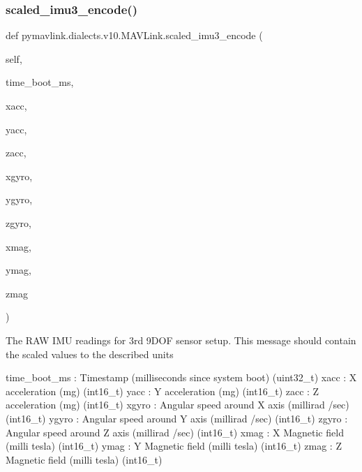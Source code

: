 \begin{DoxyVerb}
\begin{DoxyVerb}
\begin{DoxyVerb}
\begin{DoxyVerb}
\begin{DoxyVerb}
\begin{DoxyVerb}
\begin{DoxyVerb}
\begin{DoxyVerb}
\begin{DoxyVerb}
\begin{DoxyVerb}
\subsubsection{\texorpdfstring{scaled\+\_\+imu3\+\_\+encode()}{scaled\_imu3\_encode()}}
{\footnotesize\ttfamily def pymavlink.\+dialects.\+v10.\+M\+A\+V\+Link.\+scaled\+\_\+imu3\+\_\+encode (\begin{DoxyParamCaption}\item[{}]{self,  }\item[{}]{time\+\_\+boot\+\_\+ms,  }\item[{}]{xacc,  }\item[{}]{yacc,  }\item[{}]{zacc,  }\item[{}]{xgyro,  }\item[{}]{ygyro,  }\item[{}]{zgyro,  }\item[{}]{xmag,  }\item[{}]{ymag,  }\item[{}]{zmag }\end{DoxyParamCaption})}

\begin{DoxyVerb}The RAW IMU readings for 3rd 9DOF sensor setup. This message should
contain the scaled values to the described units

time_boot_ms              : Timestamp (milliseconds since system boot) (uint32_t)
xacc                      : X acceleration (mg) (int16_t)
yacc                      : Y acceleration (mg) (int16_t)
zacc                      : Z acceleration (mg) (int16_t)
xgyro                     : Angular speed around X axis (millirad /sec) (int16_t)
ygyro                     : Angular speed around Y axis (millirad /sec) (int16_t)
zgyro                     : Angular speed around Z axis (millirad /sec) (int16_t)
xmag                      : X Magnetic field (milli tesla) (int16_t)
ymag                      : Y Magnetic field (milli tesla) (int16_t)
zmag                      : Z Magnetic field (milli tesla) (int16_t)\end{DoxyVerb}
 \mbox{\label{classpymavlink_1_1dialects_1_1v10_1_1MAVLink_a28894d493bf265c31ad3fb4b7be9fd78}} 

\end{DoxyVerb}
\end{DoxyVerb}
\end{DoxyVerb}
\end{DoxyVerb}
\end{DoxyVerb}
\end{DoxyVerb}
\end{DoxyVerb}
\end{DoxyVerb}
\end{DoxyVerb}
\end{DoxyVerb}
